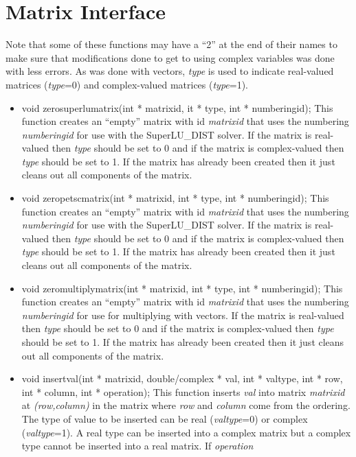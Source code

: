\section{Matrix Interface}
Note that some of these functions may have a ``2'' at the end of their names to make sure
that modifications done to get to using complex variables was done with less errors. As was done with
vectors, \textit{type} is used to indicate real-valued matrices (\textit{type}=0) and complex-valued
matrices (\textit{type}=1).
\begin{itemize}
\item  void zerosuperlumatrix(int * matrixid, it * type, int * numberingid);  This function creates
an ``empty'' matrix with id \textit{matrixid} that uses the numbering \textit{numberingid}
for use with the SuperLU\_DIST solver.  If the matrix is real-valued then \textit{type}
should be set to 0 and if the matrix is complex-valued then \textit{type} should be set to 1. 
If the matrix has already been created then it just cleans out all components of the matrix.
\item  void zeropetscmatrix(int * matrixid, int * type, int * numberingid); This function creates
an ``empty'' matrix with id \textit{matrixid} that uses the numbering \textit{numberingid}
for use with the SuperLU\_DIST solver.  If the matrix is real-valued then \textit{type}
should be set to 0 and if the matrix is complex-valued then \textit{type} should be set to 1. 
If the matrix has already been created then it just cleans out all components of the matrix.
 \item void zeromultiplymatrix(int * matrixid, int * type, int * numberingid); This function creates
an ``empty'' matrix with id \textit{matrixid} that uses the numbering \textit{numberingid}
for use for multiplying with vectors.  If the matrix is real-valued then \textit{type}
should be set to 0 and if the matrix is complex-valued then \textit{type} should be set to 1. 
If the matrix has already been created then it just cleans out all components of the matrix.
\item  void insertval(int * matrixid, double/complex * val, int * valtype, int * row, 
		   int * column, int * operation);  This function inserts \textit{val} into
matrix \textit{matrixid} at \textit{(row,column)} in the matrix where \textit{row}
and \textit{column} come from the ordering.  The type of value to
 be inserted can be real (\textit{valtype}=0)
or complex (\textit{valtype}=1).  A real type can be inserted into a complex matrix but
a complex type cannot be inserted into a real matrix.  If \textit{operation}

\end{itemize}
